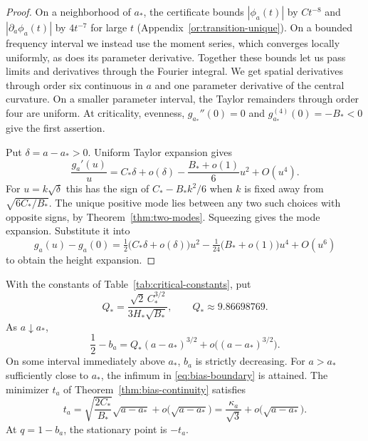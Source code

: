 \begin{proof}
On a neighborhood of $a_*$, the certificate bounds
$|\phi_a(t)|$ by $Ct^{-8}$ and $|\partial_a\phi_a(t)|$ by $4t^{-7}$
for large $t$ (Appendix~\ref{or:transition-unique}). On a bounded
frequency interval we instead use the moment series, which converges
locally uniformly, as does its parameter derivative. Together these
bounds let us pass limits and derivatives through the Fourier
integral. We get spatial derivatives through order six continuous
in $a$ and one parameter derivative of the central curvature.
On a smaller parameter interval, the Taylor remainders through order
four are uniform. At criticality, evenness, $g_{a_*}''(0)=0$ and
$g_{a_*}^{(4)}(0)=-B_*<0$ give the first assertion.

Put $\delta=a-a_*>0$. Uniform Taylor expansion gives
\[
 \frac{g_a'(u)}u=C_*\delta+o(\delta)
                  -\frac{B_*+o(1)}6u^2+O(u^4).
\]
For $u=k\sqrt\delta$ this has the sign of $C_*-B_*k^2/6$
when $k$ is fixed away from $\sqrt{6C_*/B_*}$. The unique positive
mode lies between any two such choices with opposite signs, by
Theorem~\ref{thm:two-modes}. Squeezing gives the mode expansion.
Substitute it into
\[
 g_a(u)-g_a(0)=\tfrac12\bigl(C_*\delta+o(\delta)\bigr)u^2
                  -\tfrac1{24}\bigl(B_*+o(1)\bigr)u^4+O(u^6)
\]
to obtain the height expansion.
\end{proof}

\begin{proposition}\label{prop:bias-cusp}
With the constants of Table~\ref{tab:critical-constants}, put
\[
 Q_* = \frac{\sqrt{2}\,C_*^{3/2}}{3H_*\sqrt{B_*}},
 \qquad Q_*\approx9.86698769.
\]
As $a\downarrow a_*$,
\begin{equation}\label{eq:bias-cusp}
 \frac12-b_a=Q_*(a-a_*)^{3/2}+o\bigl((a-a_*)^{3/2}\bigr).
\end{equation}
On some interval immediately above $a_*$, $b_a$ is strictly decreasing.
For $a>a_*$ sufficiently close to $a_*$, the infimum in
\eqref{eq:bias-boundary} is attained. The minimizer $t_a$ of
Theorem~\ref{thm:bias-continuity} satisfies
\[
 t_a=\sqrt{\frac{2C_*}{B_*}}\sqrt{a-a_*}
       +o\bigl(\sqrt{a-a_*}\bigr)
     =\frac{\kappa_a}{\sqrt3}+o\bigl(\sqrt{a-a_*}\bigr).
\]
At $q=1-b_a$, the stationary point is $-t_a$.
\end{proposition}

